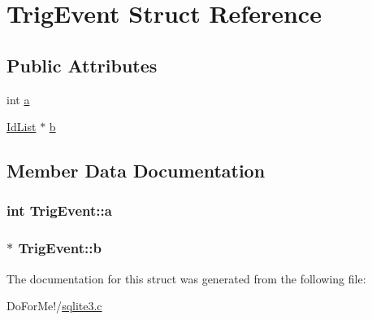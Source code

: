 \hypertarget{struct_trig_event}{\section{Trig\-Event Struct Reference}
\label{struct_trig_event}
}
\subsection*{Public Attributes}
\begin{DoxyCompactItemize}
\item 
int \hyperlink{struct_trig_event_a19ac5a5e59e08350f72ec49cf8fccbb6}{a}
\item 
\hyperlink{struct_id_list}{Id\-List} $\ast$ \hyperlink{struct_trig_event_a86ef160cde95382e98b7934614e7f79f}{b}
\end{DoxyCompactItemize}


\subsection{Member Data Documentation}
\hypertarget{struct_trig_event_a19ac5a5e59e08350f72ec49cf8fccbb6}{
\subsubsection[{a}]{\setlength{\rightskip}{0pt plus 5cm}int Trig\-Event\-::a}}\label{struct_trig_event_a19ac5a5e59e08350f72ec49cf8fccbb6}
\hypertarget{struct_trig_event_a86ef160cde95382e98b7934614e7f79f}{
\subsubsection[{b}]{$\ast$ Trig\-Event\-::b}}\label{struct_trig_event_a86ef160cde95382e98b7934614e7f79f}


The documentation for this struct was generated from the following file\-:\begin{DoxyCompactItemize}
\item 
Do\-For\-Me!/\hyperlink{sqlite3_8c}{sqlite3.\-c}\end{DoxyCompactItemize}
